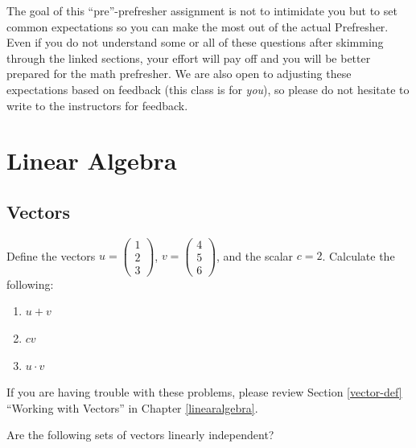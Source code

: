 \documentclass[
]{book}
\providecommand{\tightlist}{%
  \setlength{\itemsep}{0pt}\setlength{\parskip}{0pt}}
\theoremstyle{definition}
\theoremstyle{definition}
\theoremstyle{definition}
\theoremstyle{remark}
\begin{document}
The goal of this ``pre''-prefresher assignment is not to intimidate you but to set common expectations so you can make the most out of the actual Prefresher. Even if you do not understand some or all of these questions after skimming through the linked sections, your effort will pay off and you will be better prepared for the math prefresher. We are also open to adjusting these expectations based on feedback (this class is for \emph{you}), so please do not hesitate to write to the instructors for feedback.

\hypertarget{linear-algebra}{%
\section*{Linear Algebra}\label{linear-algebra}}

\hypertarget{vectors}{%
\subsection*{Vectors}\label{vectors}}

Define the vectors \(u = \begin{pmatrix} 1 \\2 \\3 \end{pmatrix}\), \(v = \begin{pmatrix} 4\\5\\6 \end{pmatrix}\), and the scalar \(c = 2\). Calculate the following:

\begin{enumerate}
\def\labelenumi{\arabic{enumi}.}
\tightlist
\item
  \(u + v\)
\item
  \(cv\)
\item
  \(u \cdot v\)
\end{enumerate}

If you are having trouble with these problems, please review Section \ref{vector-def} ``Working with Vectors'' in Chapter \ref{linearalgebra}.

Are the following sets of vectors linearly independent?
\end{document}
